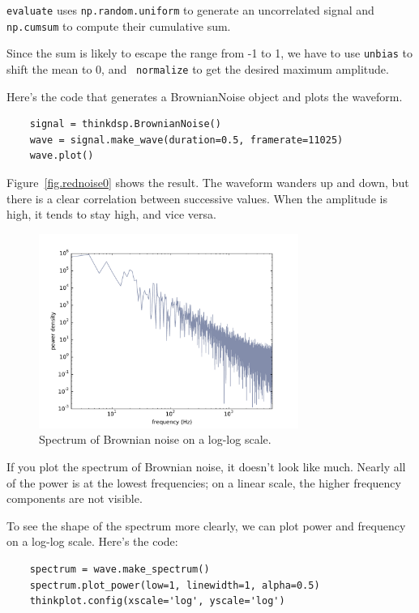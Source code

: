 \documentclass[12pt]{book}
\begin{document}
{\tt evaluate} uses {\tt np.random.uniform} to generate an
uncorrelated signal and {\tt np.cumsum} to compute their cumulative
sum.

Since the sum is likely to escape the range from -1 to
1, we have to use {\tt unbias} to shift the mean to 0, and {\tt
  normalize} to get the desired maximum amplitude.

Here's the code that generates a BrownianNoise object and plots the
waveform.

\begin{verbatim}
    signal = thinkdsp.BrownianNoise()
    wave = signal.make_wave(duration=0.5, framerate=11025)
    wave.plot()
\end{verbatim}

Figure~\ref{fig.rednoise0} shows the result.  The waveform
wanders up and down, but there is a clear correlation between
successive values.  When the amplitude is high, it tends to stay
high, and vice versa.

\begin{figure}
\centerline{\includegraphics[height=2.5in]{figs/rednoise3.pdf}}
\caption{Spectrum of Brownian noise on a log-log scale.}
\label{fig.rednoise3}
\end{figure}

If you plot the spectrum of Brownian noise, it doesn't look like
much.  Nearly all of the power is at the lowest frequencies; on a
linear scale, the higher frequency components are not visible.

To see the shape of the spectrum more clearly, we can plot power
and frequency on a log-log scale.  Here's the code:

\begin{verbatim}
    spectrum = wave.make_spectrum()
    spectrum.plot_power(low=1, linewidth=1, alpha=0.5)
    thinkplot.config(xscale='log', yscale='log')
\end{verbatim}
\end{document}
